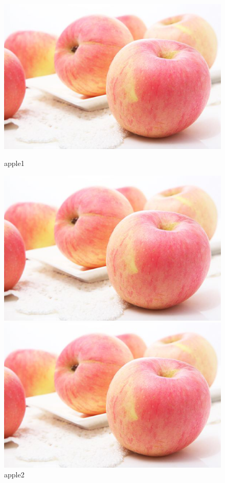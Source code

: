 \documentclass[a4paper]{article}
\begin{document}
	\begin{figure}[htbp]
		\centering
		\begin{minipage}[b]{0.45\textwidth}
			\centering
			\includegraphics[scale=0.15]{apple.eps}
			\caption{apple1}
		\end{minipage}
		\begin{minipage}[b]{0.45\textwidth}
			\centering
			\includegraphics[scale=0.15]{apple.eps}
			\caption{apple2}
		\end{minipage}
		\begin{minipage}[b]{0.45\textwidth}
			\centering
			\includegraphics[scale=0.15]{apple.eps}

\end{minipage}
\end{figure}
\end{document}

